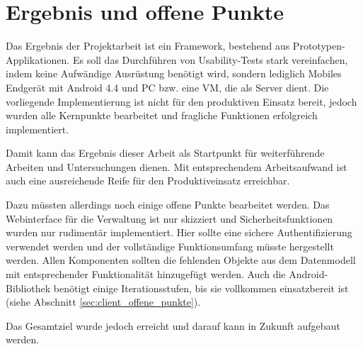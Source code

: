 \section{Ergebnis und offene Punkte}

Das Ergebnis der Projektarbeit ist ein Framework, bestehend aus Prototypen-Applikationen.
Es soll das Durchführen von Usability-Tests stark vereinfachen, indem keine Aufwändige Ausrüstung benötigt wird, sondern lediglich Mobiles Endgerät mit Android 4.4 und PC bzw. eine \ac{VM}, die als Server dient.
Die vorliegende Implementierung ist nicht für den produktiven Einsatz bereit, jedoch wurden alle Kernpunkte bearbeitet und fragliche Funktionen erfolgreich implementiert.

Damit kann das Ergebnis dieser Arbeit als Startpunkt für weiterführende Arbeiten und Untersuchungen dienen.
Mit entsprechendem Arbeitsaufwand ist auch eine ausreichende Reife für den Produktiveinsatz erreichbar.

Dazu müssten allerdings noch einige offene Punkte bearbeitet werden.
Das Webinterface für die Verwaltung ist nur skizziert und Sicherheitsfunktionen wurden nur rudimentär implementiert. 
Hier sollte eine sichere Authentifizierung verwendet werden und der vollständige Funktionsumfang müsste hergestellt werden.
Allen Komponenten sollten die fehlenden Objekte aus dem Datenmodell mit entsprechender Funktionalität hinzugefügt werden.
Auch die Android-Bibliothek benötigt einige Iterationsstufen, bis sie vollkommen einsatzbereit ist (siehe Abschnitt \ref{sec:client_offene_punkte}).

Das Gesamtziel wurde jedoch erreicht und darauf kann in Zukunft aufgebaut werden.